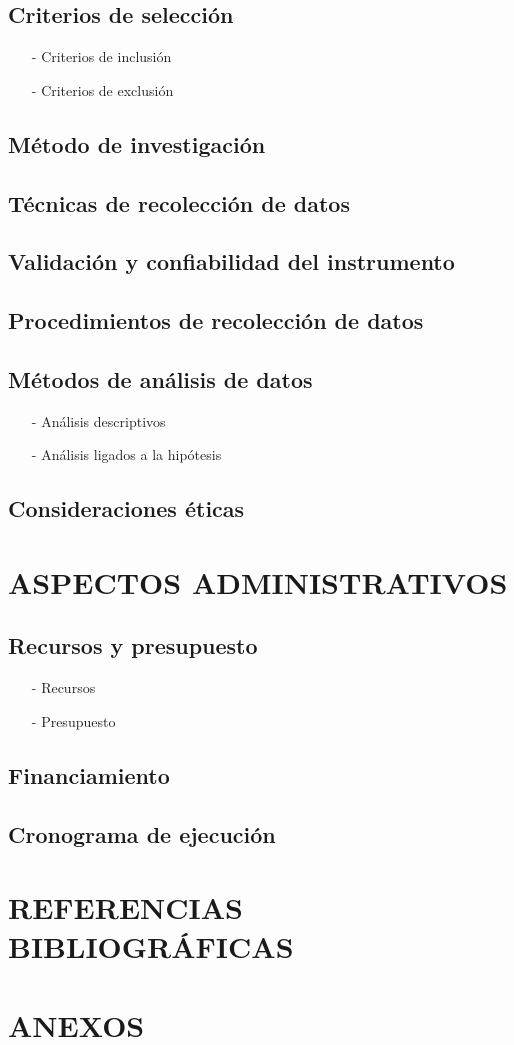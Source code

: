 \documentclass{report}
\begin{document}
\subsection{Criterios de selección}
\begin{enumerate}
\item[-] Criterios de inclusión
\item[-] Criterios de exclusión
\end{enumerate}
\subsection{Método de investigación}
\subsection{Técnicas de recolección de datos}
\subsection{Validación y confiabilidad del instrumento}
\subsection{Procedimientos de recolección de datos}
\subsection{Métodos de análisis de datos}
\begin{enumerate}
\item[-] Análisis descriptivos
\item[-] Análisis ligados a la hipótesis
\end{enumerate}
\subsection{Consideraciones éticas}

\section{ASPECTOS ADMINISTRATIVOS}
\subsection{Recursos y presupuesto}
\begin{enumerate}
\item[-] Recursos
\item[-] Presupuesto
\end{enumerate}
\subsection{Financiamiento}
\subsection{Cronograma de ejecución}

\section{REFERENCIAS BIBLIOGRÁFICAS}
\section{ANEXOS}
\end{document}
